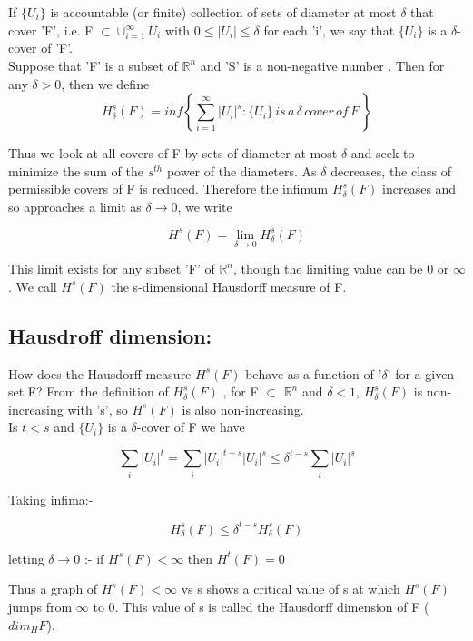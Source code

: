 \documentclass[14pt]{extarticle}
\begin{document}
If $\lbrace U_i \rbrace$ is accountable (or finite) collection of sets of diameter at most $\delta$ that cover 'F', i.e. F $\subset \cup_{i=1}^{\infty} U_i$ with $0 \leq |U_i| \leq \delta$ for each 'i', we say that $\lbrace U_i \rbrace$ is a $\delta$-cover of 'F'.\\

Suppose that 'F' is a subset of $\mathbb{R}^n$ and 'S' is a non-negative number . Then for any $\delta > 0$, then we define\\

$$H_{\delta}^s(F)=inf \left\lbrace \sum_{i=1}^{\infty} |U_i|^s : \lbrace U_i \rbrace \, is \, a \, \delta \, cover \, of \, F \, \right\rbrace $$


Thus we look at all covers of F by sets of diameter at most $\delta$ and seek to minimize the sum of the $s^{th}$ power of the diameters. As $\delta$ decreases, the class of permissible covers of F is reduced. Therefore the infimum $H_{\delta}^s(F)$ increases and so approaches a limit as $\delta \rightarrow 0$, we write

$$H^s(F)= \lim_{\delta \rightarrow 0} H_{\delta}^s(F) $$

This limit exists for any subset 'F' of $\mathbb{R}^n$, though the limiting value can be 0 or $\infty$. We call $H^s(F)$ the s-dimensional Hausdorff measure of F.

\subsection{Hausdroff dimension:}

How does the Hausdorff measure $H^s(F)$ behave as a function of '$\delta$' for a given set F? From the definition of $H_{\delta}^s(F)$ , for F $\subset$ $\mathbb{R}^n$ and $\delta < 1$, $H_{\delta}^s(F)$ is non-increasing with 's', so $H^s(F)$ is also non-increasing.\\

Is $t<s$ and $\lbrace U_i \rbrace$ is a $\delta$-cover of F we have 

$$\sum_i |U_i|^t = \sum_i |U_i|^{t-s} |U_i|^s \leq \delta^{t-s} \sum_i |U_i|^s $$ 

Taking infima:- 

$$H_{\delta}^s(F) \leq \delta^{t-s} H_{\delta}^s(F)$$

letting $\delta \rightarrow 0$ :-   \quad if $H^s(F) < \infty$ then $H^t(F)=0$

Thus a graph of $H^s(F)< \infty$ vs s shows a critical value of s at which $H^s(F)$ jumps from $\infty$ to 0. This value of s is called the Hausdorff dimension of F ($dim_H F$).\\
\end{document}
